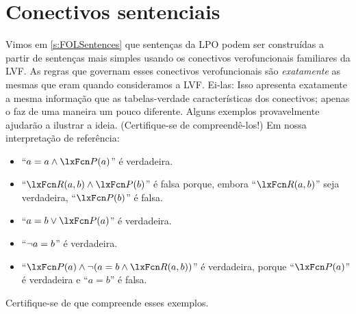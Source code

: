 \section{Conectivos sentenciais}
Vimos em \cref{s:FOLSentences} que sentenças da LPO podem ser construídas a partir de sentenças mais simples usando os conectivos verofuncionais familiares da LVF. As regras que governam esses conectivos verofuncionais são \emph{exatamente} as mesmas que eram quando consideramos a LVF. Ei-las:
Isso apresenta exatamente a mesma informação que as tabelas-verdade características dos conectivos; apenas o faz de uma maneira um pouco diferente. Alguns exemplos provavelmente ajudarão a ilustrar a ideia. (Certifique-se de compreendê-los!) Em nossa interpretação de referência:
	\begin{itemize}
\item \textquotedblleft $a = a \eand \atom{P}{a}$\textquotedblright{} é verdadeira.
\item \textquotedblleft $\atom{R}{a,b} \eand \atom{P}{b}$\textquotedblright{} é falsa porque, embora \textquotedblleft $\atom{R}{a,b}$\textquotedblright{} seja verdadeira, \textquotedblleft $\atom{P}{b}$\textquotedblright{} é falsa.
\item \textquotedblleft $a = b \eor \atom{P}{a}$\textquotedblright{} é verdadeira.
\item \textquotedblleft $\neg a = b$\textquotedblright{} é verdadeira.
\item \textquotedblleft $\atom{P}{a} \eand \enot( a= b \eand \atom{R}{a,b})$\textquotedblright{} é verdadeira, porque \textquotedblleft $\atom{P}{a}$\textquotedblright{} é verdadeira e \textquotedblleft $a = b$\textquotedblright{} é falsa.
	\end{itemize}
Certifique-se de que compreende esses exemplos.

